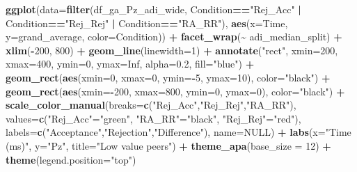 \documentclass[
]{article}
\newenvironment{Shaded}{\begin{snugshade}}{\end{snugshade}}
\newcommand{\AttributeTok}[1]{\textcolor[rgb]{0.13,0.29,0.53}{#1}}
\newcommand{\ConstantTok}[1]{\textcolor[rgb]{0.56,0.35,0.01}{#1}}
\newcommand{\DecValTok}[1]{\textcolor[rgb]{0.00,0.00,0.81}{#1}}
\newcommand{\FloatTok}[1]{\textcolor[rgb]{0.00,0.00,0.81}{#1}}
\newcommand{\FunctionTok}[1]{\textcolor[rgb]{0.13,0.29,0.53}{\textbf{#1}}}
\newcommand{\NormalTok}[1]{#1}
\newcommand{\OtherTok}[1]{\textcolor[rgb]{0.56,0.35,0.01}{#1}}
\newcommand{\SpecialCharTok}[1]{\textcolor[rgb]{0.81,0.36,0.00}{\textbf{#1}}}
\newcommand{\StringTok}[1]{\textcolor[rgb]{0.31,0.60,0.02}{#1}}
\begin{document}
\begin{Shaded}
\begin{Highlighting}[]
\FunctionTok{ggplot}\NormalTok{(}\AttributeTok{data=}\FunctionTok{filter}\NormalTok{(df\_ga\_Pz\_adi\_wide, Condition}\SpecialCharTok{==}\StringTok{"Rej\_Acc"} \SpecialCharTok{|}\NormalTok{ Condition}\SpecialCharTok{==}\StringTok{"Rej\_Rej"} \SpecialCharTok{|}\NormalTok{ Condition}\SpecialCharTok{==}\StringTok{"RA\_RR"}\NormalTok{), }\FunctionTok{aes}\NormalTok{(}\AttributeTok{x=}\NormalTok{Time, }\AttributeTok{y=}\NormalTok{grand\_average, }\AttributeTok{color=}\NormalTok{Condition)) }\SpecialCharTok{+}
  \FunctionTok{facet\_wrap}\NormalTok{(}\SpecialCharTok{\textasciitilde{}}\NormalTok{ adi\_median\_split) }\SpecialCharTok{+}
  \FunctionTok{xlim}\NormalTok{(}\SpecialCharTok{{-}}\DecValTok{200}\NormalTok{, }\DecValTok{800}\NormalTok{) }\SpecialCharTok{+}
  \FunctionTok{geom\_line}\NormalTok{(}\AttributeTok{linewidth=}\DecValTok{1}\NormalTok{) }\SpecialCharTok{+}
  \FunctionTok{annotate}\NormalTok{(}\StringTok{"rect"}\NormalTok{, }\AttributeTok{xmin=}\DecValTok{200}\NormalTok{, }\AttributeTok{xmax=}\DecValTok{400}\NormalTok{, }\AttributeTok{ymin=}\DecValTok{0}\NormalTok{, }\AttributeTok{ymax=}\ConstantTok{Inf}\NormalTok{, }\AttributeTok{alpha=}\FloatTok{0.2}\NormalTok{, }\AttributeTok{fill=}\StringTok{"blue"}\NormalTok{) }\SpecialCharTok{+}
  \FunctionTok{geom\_rect}\NormalTok{(}\FunctionTok{aes}\NormalTok{(}\AttributeTok{xmin=}\DecValTok{0}\NormalTok{, }\AttributeTok{xmax=}\DecValTok{0}\NormalTok{, }\AttributeTok{ymin=}\SpecialCharTok{{-}}\DecValTok{5}\NormalTok{, }\AttributeTok{ymax=}\DecValTok{10}\NormalTok{), }\AttributeTok{color=}\StringTok{"black"}\NormalTok{) }\SpecialCharTok{+}
  \FunctionTok{geom\_rect}\NormalTok{(}\FunctionTok{aes}\NormalTok{(}\AttributeTok{xmin=}\SpecialCharTok{{-}}\DecValTok{200}\NormalTok{, }\AttributeTok{xmax=}\DecValTok{800}\NormalTok{, }\AttributeTok{ymin=}\DecValTok{0}\NormalTok{, }\AttributeTok{ymax=}\DecValTok{0}\NormalTok{), }\AttributeTok{color=}\StringTok{"black"}\NormalTok{) }\SpecialCharTok{+}
  \FunctionTok{scale\_color\_manual}\NormalTok{(}\AttributeTok{breaks=}\FunctionTok{c}\NormalTok{(}\StringTok{"Rej\_Acc"}\NormalTok{,}\StringTok{"Rej\_Rej"}\NormalTok{,}\StringTok{"RA\_RR"}\NormalTok{),}
                     \AttributeTok{values=}\FunctionTok{c}\NormalTok{(}\StringTok{"Rej\_Acc"}\OtherTok{=}\StringTok{"green"}\NormalTok{, }\StringTok{"RA\_RR"}\OtherTok{=}\StringTok{"black"}\NormalTok{, }\StringTok{"Rej\_Rej"}\OtherTok{=}\StringTok{"red"}\NormalTok{), }
                     \AttributeTok{labels=}\FunctionTok{c}\NormalTok{(}\StringTok{"Acceptance"}\NormalTok{,}\StringTok{"Rejection"}\NormalTok{,}\StringTok{"Difference"}\NormalTok{), }\AttributeTok{name=}\ConstantTok{NULL}\NormalTok{) }\SpecialCharTok{+}
  \FunctionTok{labs}\NormalTok{(}\AttributeTok{x=}\StringTok{"Time (ms)"}\NormalTok{, }\AttributeTok{y=}\StringTok{"Pz"}\NormalTok{, }\AttributeTok{title=}\StringTok{"Low value peers"}\NormalTok{) }\SpecialCharTok{+}
  \FunctionTok{theme\_apa}\NormalTok{(}\AttributeTok{base\_size =} \DecValTok{12}\NormalTok{) }\SpecialCharTok{+} \FunctionTok{theme}\NormalTok{(}\AttributeTok{legend.position=}\StringTok{"top"}\NormalTok{)}
\end{Highlighting}
\end{Shaded}
\end{document}
